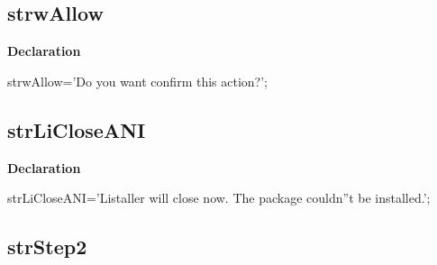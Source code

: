 \documentclass{report}
\newif\ifpdf
\begin{document}
\subsection*{strwAllow}
\fi
\label{trstrings-strwAllow}
\begin{list}{}{
\setlength{\itemindent}{0cm}
\setlength{\listparindent}{0cm}
\setlength{\leftmargin}{\evensidemargin}
\addtolength{\leftmargin}{\tmplength}
\settowidth{\labelsep}{X}
\addtolength{\leftmargin}{\labelsep}
\setlength{\labelwidth}{\tmplength}
}
\item[\textbf{Declaration}\hfill]
\ifpdf
\begin{flushleft}
\fi
\begin{ttfamily}
strwAllow='Do you want confirm this action?';\end{ttfamily}

\ifpdf
\end{flushleft}
\fi

\end{list}
\ifpdf
\subsection*{\large{\textbf{strLiCloseANI}}\normalsize\hspace{1ex}\hrulefill}
\else
\subsection*{strLiCloseANI}
\fi
\label{trstrings-strLiCloseANI}
\begin{list}{}{
\setlength{\itemindent}{0cm}
\setlength{\listparindent}{0cm}
\setlength{\leftmargin}{\evensidemargin}
\addtolength{\leftmargin}{\tmplength}
\settowidth{\labelsep}{X}
\addtolength{\leftmargin}{\labelsep}
\setlength{\labelwidth}{\tmplength}
}
\item[\textbf{Declaration}\hfill]
\ifpdf
\begin{flushleft}
\fi
\begin{ttfamily}
strLiCloseANI='Listaller will close now. The package couldn''t be installed.';\end{ttfamily}

\ifpdf
\end{flushleft}
\fi

\end{list}
\ifpdf
\subsection*{\large{\textbf{strStep2}}\normalsize\hspace{1ex}\hrulefill}
\else
\end{document}
